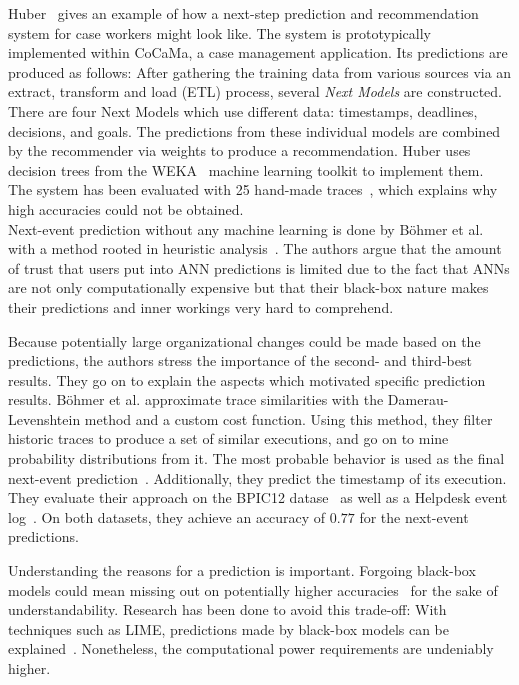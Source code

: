 Huber~\cite{huber2015} gives an example of how a next-step prediction and recommendation system for case workers might look like. The system is prototypically implemented within CoCaMa, a case management application. Its predictions are produced as follows: After gathering the training data from various sources via an extract, transform and load (ETL) process, several \textit{Next Models} are constructed. There are four Next Models which use different data: timestamps, deadlines, decisions, and goals. The predictions from these individual models are combined by the recommender via weights to produce a recommendation. Huber uses decision trees from the WEKA~\cite{web:weka} machine learning toolkit to implement them. The system has been evaluated with 25 hand-made traces~\cite{huber2015}, which explains why high accuracies could not be obtained.\\

Next-event prediction without any machine learning is done by Böhmer et al. with a method rooted in heuristic analysis~\cite{boehmer2018probability}. The authors argue that the amount of trust that users put into ANN predictions is limited due to the fact that ANNs are not only computationally expensive but that their black-box nature makes their predictions and inner workings very hard to comprehend.

Because potentially large organizational changes could be made based on the predictions, the authors stress the importance of the second- and third-best results. They go on to explain the aspects which motivated specific prediction results.
Böhmer et al. approximate trace similarities with the Damerau-Levenshtein method and a custom cost function. Using this method, they filter historic traces to produce a set of similar executions, and go on to mine probability distributions from it. The most probable behavior is used as the final next-event prediction~\cite{boehmer2018probability}. Additionally, they predict the timestamp of its execution. They evaluate their approach on the BPIC12 datase~\cite{BPIC2012} as well as a Helpdesk event log~\cite{Helpdesk}. On both datasets, they achieve an accuracy of $0.77$ for the next-event predictions.

Understanding the reasons for a prediction is important. Forgoing black-box models could mean missing out on potentially higher accuracies~\cite{tax2018interdisciplinary} for the sake of understandability. Research has been done to avoid this trade-off: With techniques such as LIME, predictions made by black-box models can be explained~\cite{ribeiro2016should}. Nonetheless, the computational power requirements are undeniably higher.\\


